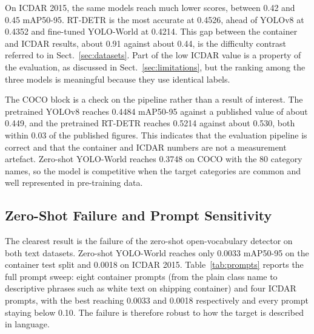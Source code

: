 \documentclass[conference]{IEEEtran}
\begin{document}
On ICDAR 2015, the same models reach much lower scores, between 0.42 and 0.45 mAP50-95. RT-DETR is the most accurate at 0.4526, ahead of YOLOv8 at 0.4352 and fine-tuned YOLO-World at 0.4214. This gap between the container and ICDAR results, about 0.91 against about 0.44, is the difficulty contrast referred to in Sect.~\ref{sec:datasets}. Part of the low ICDAR value is a property of the evaluation, as discussed in Sect.~\ref{sec:limitations}, but the ranking among the three models is meaningful because they use identical labels.

The COCO block is a check on the pipeline rather than a result of interest. The pretrained YOLOv8 reaches 0.4484 mAP50-95 against a published value of about 0.449, and the pretrained RT-DETR reaches 0.5214 against about 0.530, both within 0.03 of the published figures. This indicates that the evaluation pipeline is correct and that the container and ICDAR numbers are not a measurement artefact. Zero-shot YOLO-World reaches 0.3748 on COCO with the 80 category names, so the model is competitive when the target categories are common and well represented in pre-training data.

\subsection{Zero-Shot Failure and Prompt Sensitivity}

The clearest result is the failure of the zero-shot open-vocabulary detector on both text datasets. Zero-shot YOLO-World reaches only 0.0033 mAP50-95 on the container test split and 0.0018 on ICDAR 2015. Table~\ref{tab:prompts} reports the full prompt sweep: eight container prompts (from the plain class name to descriptive phrases such as white text on shipping container) and four ICDAR prompts, with the best reaching 0.0033 and 0.0018 respectively and every prompt staying below 0.10. The failure is therefore robust to how the target is described in language.
\end{document}
